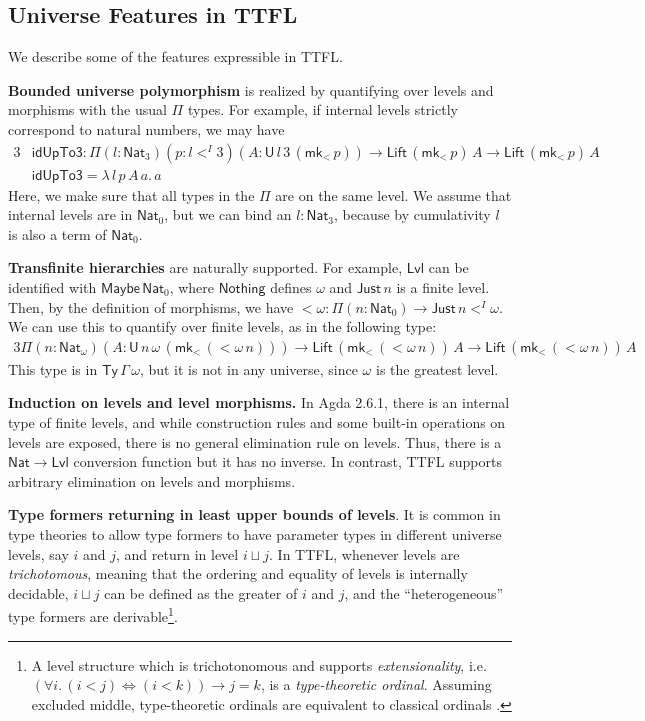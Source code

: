 \documentclass[a4paper,UKenglish,cleveref, autoref, thm-restate]{lipics-v2021}
\theoremstyle{remark}
\theoremstyle{definition}
\newcommand{\Ty}{\mathsf{Ty}}
\newcommand{\U}{\mathsf{U}}
\newcommand{\Nat}{\mathsf{Nat}}
\newcommand{\Lift}{\mathsf{Lift}}
\newcommand{\Lvl}{\mathsf{Lvl}}
\renewcommand{\U}{\mathsf{U}}
\newcommand{\msf}[1]{\mathsf{#1}}
\newcommand{\mkMor}{\msf{mk}\!_<}
\begin{document}
\subsection{Universe Features in TTFL}

We describe some of the features expressible in TTFL.

\textbf{Bounded universe polymorphism} is realized by quantifying
over levels and morphisms with the usual $\Pi$ types. For example, if internal
levels strictly correspond to natural numbers, we may have
\begin{alignat*}{3}
  &\msf{idUpTo3} : \Pi(l : \Nat_3)(p : l <^I 3)(A : \U\,l\,3\,(\mkMor\,p)) \to \Lift\,(\mkMor\,p)\,A \to \Lift\,(\mkMor\,p)\,A\\
  &\msf{idUpTo3} = \lambda\,l\,p\,A\,a.\,a
\end{alignat*}
Here, we make sure that all types in the $\Pi$ are on the same level. We assume
that internal levels are in $\Nat_0$, but we can bind an $l : \Nat_3$, because
by cumulativity $l$ is also a term of $\Nat_0$.

\textbf{Transfinite hierarchies} are naturally supported. For example, $\Lvl$
can be identified with $\msf{Maybe}\,\Nat_0$, where $\msf{Nothing}$ defines
$\omega$ and $\msf{Just}\,n$ is a finite level. Then, by the definition of
morphisms, we have $<\!\omega : \Pi(n : \Nat_0) \to \msf{Just}\,n <^I \omega$.
We can use this to quantify over finite levels, as in the following type:
\begin{alignat*}{3}
  \Pi(n : \Nat_{\omega})(A : \U\,n\,\omega\,(\mkMor\,(<\!\omega\,n))) \to \Lift\,(\mkMor\,(<\!\omega\,n))\,A \to \Lift\,(\mkMor\,(<\!\omega\,n))\,A
\end{alignat*}
This type is in $\Ty\,\Gamma\,\omega$, but it is not in any universe, since
$\omega$ is the greatest level.

\textbf{Induction on levels and level morphisms.} In Agda 2.6.1, there is an
internal type of finite levels, and while construction rules and some built-in
operations on levels are exposed, there is no general elimination rule on
levels. Thus, there is a $\Nat \to \Lvl$ conversion function but it has no
inverse. In contrast, TTFL supports arbitrary elimination on levels and
morphisms.

\textbf{Type formers returning in least upper bounds of levels}. It is common in
type theories to allow type formers to have parameter types in different
universe levels, say $i$ and $j$, and return in level $i \sqcup j$. In TTFL,
whenever levels are \emph{trichotomous}, meaning that the ordering and equality
of levels is internally decidable, $i \sqcup j$ can be defined as the greater of
$i$ and $j$, and the ``heterogeneous'' type formers are derivable\footnote{A
level structure which is trichotonomous and supports \emph{extensionality},
i.e.\ $(\forall i.\, (i < j) \iff (i < k)) \to j = k$, is a
\emph{type-theoretic ordinal}. Assuming excluded middle, type-theoretic
ordinals are equivalent to classical ordinals \cite[Section 10.3]{hottbook}.}.
\end{document}
